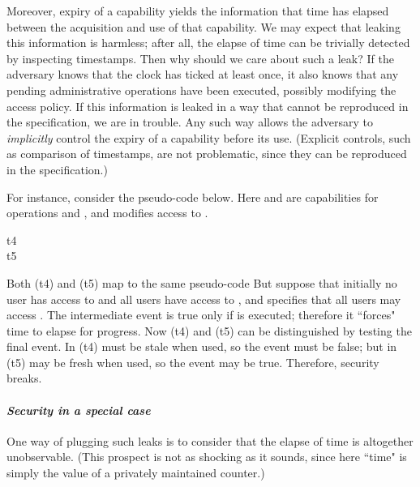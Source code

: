 \documentclass[10pt]{article}
\begin{document}
Moreover, expiry of a capability yields the information that time has elapsed between the acquisition and use of that capability. We may expect that leaking this information is harmless; after all, the elapse of time can be trivially detected by inspecting timestamps. Then why should we care about such a leak? If the adversary knows that the clock has ticked at least once, it also knows that any pending administrative operations have been executed, possibly modifying the access policy. If this information is leaked in a way that cannot be reproduced in the specification, we are in trouble. Any such way allows the adversary to \emph{implicitly} control the expiry of a capability before its use. (Explicit controls, such as comparison of timestamps, are not problematic, since they can be reproduced in the specification.) 

For instance, consider the  pseudo-code below. 
Here  and  are capabilities for operations  and , and  modifies access to . 
\begin{description}
\item[t4] 




\item[t5] 


\end{description}
Both (t4) and (t5) map to the same  pseudo-code  
But suppose that initially no user has access to  and all users have access to , and  specifies that all users may access . The intermediate  event is true only if  is executed; therefore it ``forces" time to elapse for progress. Now (t4) and (t5) can be distinguished by testing the final  event. In (t4)  must be stale when used, so the event must be false; but in (t5)  may be fresh when used, so the event may be true. Therefore, security breaks.



\paragraph{\em Security in a special case}
One way of plugging such leaks is to consider that the elapse of time is altogether unobservable. (This prospect is not as shocking as it sounds, since here ``time" is simply the value of a privately maintained counter.) 
\end{document}
